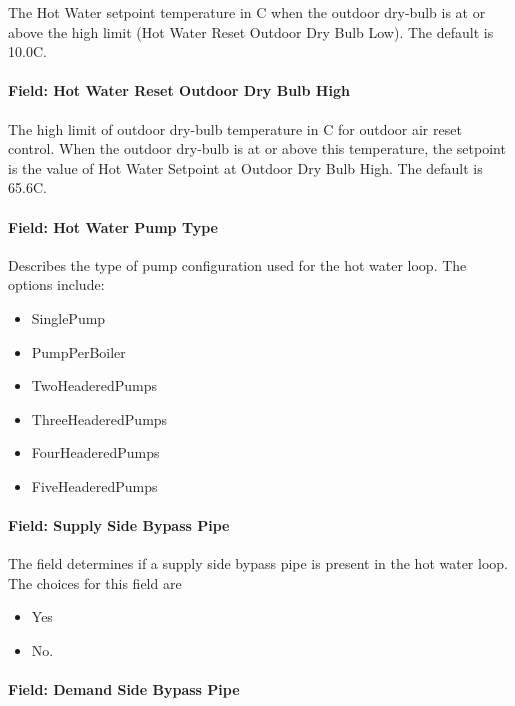 The Hot Water setpoint temperature in C when the outdoor dry-bulb is at or above the high limit (Hot Water Reset Outdoor Dry Bulb Low). The default is 10.0C.

\paragraph{Field: Hot Water Reset Outdoor Dry Bulb High}\label{field-hot-water-reset-outdoor-dry-bulb-high}

The high limit of outdoor dry-bulb temperature in C for outdoor air reset control. When the outdoor dry-bulb is at or above this temperature, the setpoint is the value of Hot Water Setpoint at Outdoor Dry Bulb High. The default is 65.6C.

\paragraph{Field: Hot Water Pump Type}\label{field-hot-water-pump-type}

Describes the type of pump configuration used for the hot water loop. The options include:

\begin{itemize}
\item
  SinglePump
\item
  PumpPerBoiler
\item
  TwoHeaderedPumps
\item
  ThreeHeaderedPumps
\item
  FourHeaderedPumps
\item
  FiveHeaderedPumps
\end{itemize}

\paragraph{Field: Supply Side Bypass Pipe}\label{field-supply-side-bypass-pipe}

The field determines if a supply side bypass pipe is present in the hot water loop. The choices for this field are

\begin{itemize}
\item
  Yes
\item
  No.
\end{itemize}

\paragraph{Field: Demand Side Bypass Pipe}\label{field-demand-side-bypass-pipe}

